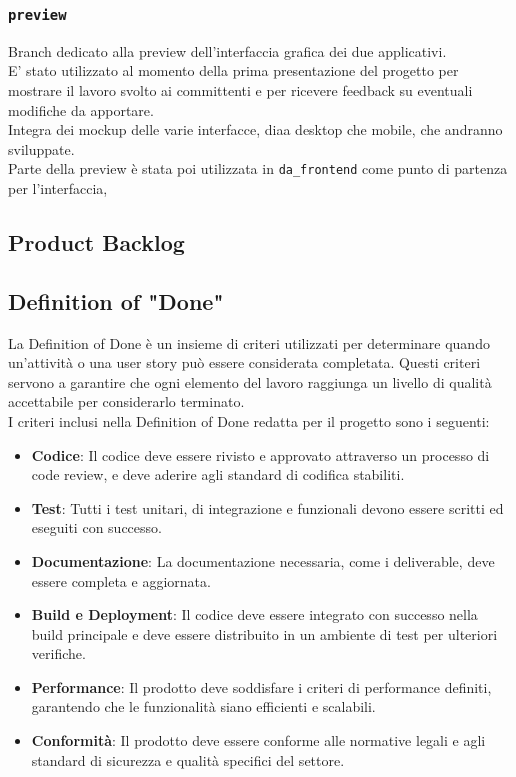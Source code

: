 \documentclass{article}
\begin{document}
\subsubsection{\texttt{preview}}
Branch dedicato alla preview dell'interfaccia grafica dei due applicativi.\\
E' stato utilizzato al momento della prima presentazione del progetto per mostrare il lavoro svolto ai committenti e per ricevere feedback su eventuali modifiche da apportare.\\
Integra dei mockup delle varie interfacce, diaa desktop che mobile, che andranno sviluppate.\\
Parte della preview è stata poi utilizzata in \texttt{da\_frontend} come punto di partenza per l'interfaccia,

\subsection{Product Backlog}


\subsection{Definition of "Done"}
La Definition of Done è un insieme di criteri utilizzati per determinare quando un'attività o una user story può essere considerata completata. Questi criteri servono a garantire che ogni elemento del lavoro raggiunga un livello di qualità accettabile per considerarlo terminato.\\
I criteri inclusi nella Definition of Done redatta per il progetto sono i seguenti:
\begin{itemize}
    \item \textbf{Codice}: Il codice deve essere rivisto e approvato attraverso un processo di code review, e deve aderire agli standard di codifica stabiliti.
    \item \textbf{Test}: Tutti i test unitari, di integrazione e funzionali devono essere scritti ed eseguiti con successo.
    \item \textbf{Documentazione}: La documentazione necessaria, come i deliverable, deve essere completa e aggiornata.
    \item \textbf{Build e Deployment}: Il codice deve essere integrato con successo nella build principale e deve essere distribuito in un ambiente di test per ulteriori verifiche.
    \item \textbf{Performance}: Il prodotto deve soddisfare i criteri di performance definiti, garantendo che le funzionalità siano efficienti e scalabili.
    \item \textbf{Conformità}: Il prodotto deve essere conforme alle normative legali e agli standard di sicurezza e qualità specifici del settore. 
\end{itemize}
\end{document}
